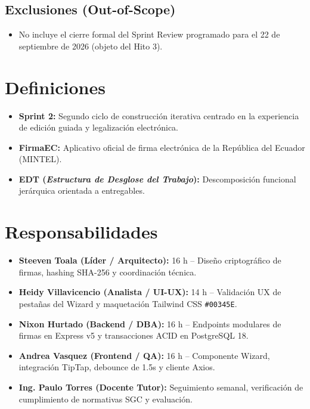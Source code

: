 \documentclass[12pt,a4paper]{article}
\begin{document}
\subsection{Exclusiones (Out-of-Scope)}
\begin{itemize}[leftmargin=1.5em, itemsep=1.5pt]
    \item No incluye el cierre formal del Sprint Review programado para el 22 de septiembre de 2026 (objeto del Hito 3).
\end{itemize}

\section{Definiciones}
\begin{itemize}[leftmargin=1.5em, itemsep=2pt, topsep=2pt]
    \item \textbf{Sprint 2:} Segundo ciclo de construcción iterativa centrado en la experiencia de edición guiada y legalización electrónica.
    \item \textbf{FirmaEC:} Aplicativo oficial de firma electrónica de la República del Ecuador (MINTEL).
    \item \textbf{EDT (\textit{Estructura de Desglose del Trabajo}):} Descomposición funcional jerárquica orientada a entregables.
\end{itemize}

\section{Responsabilidades}
\begin{itemize}[leftmargin=1.5em, itemsep=2pt, topsep=2pt]
    \item \textbf{Steeven Toala (Líder / Arquitecto):} 16 h -- Diseño criptográfico de firmas, hashing SHA-256 y coordinación técnica.
    \item \textbf{Heidy Villavicencio (Analista / UI-UX):} 14 h -- Validación UX de pestañas del Wizard y maquetación Tailwind CSS \texttt{\#00345E}.
    \item \textbf{Nixon Hurtado (Backend / DBA):} 16 h -- Endpoints modulares de firmas en Express v5 y transacciones ACID en PostgreSQL 18.
    \item \textbf{Andrea Vasquez (Frontend / QA):} 16 h -- Componente Wizard, integración TipTap, debounce de 1.5s y cliente Axios.
    \item \textbf{Ing. Paulo Torres (Docente Tutor):} Seguimiento semanal, verificación de cumplimiento de normativas SGC y evaluación.
\end{itemize}
\end{document}
